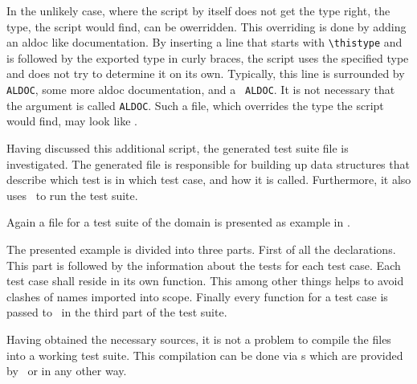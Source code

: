 In the unlikely case, where the script by itself does not get the type right, the type, the script would find, can be owerridden. This overriding is done by adding an aldoc like documentation. By inserting a line that starts with \verb|\thistype| and is followed by the exported type in curly braces, the script uses the specified type and does not try to determine it on its own. Typically, this line is surrounded by {\tt{} ALDOC}, some more aldoc documentation, and a {\tt{} ALDOC}. It is not necessary that the  argument is called {\tt ALDOC}. Such a file, which overrides the type the script would find, may look like .


Having discussed this additional script, the generated test suite file is investigated. The generated file is responsible for building up data structures that describe which test is in which test case, and how it is called. Furthermore, it also uses \projectname~to run the test suite.

Again a file for a test suite of the  domain is presented as example in .


The presented example is divided into three parts. First of all the declarations. This part is followed by the information about the tests for each test case. Each test case shall reside in its own function. This among other things helps to avoid clashes of names imported into scope. Finally every function for a test case is passed to \LibAldorUnit~in the third part of the test suite.

Having obtained the necessary sources, it is not a problem to compile the files into a working test suite. This compilation can be done via s which are provided by \LibModel~or in any other way.
